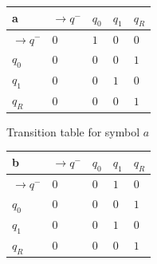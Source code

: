 \documentclass{mini}
\begin{document}
%
%
\begin{figure}[H]
    \begin{center}
        
        \setlength{\tabcolsep}{4pt}
        \renewcommand{\arraystretch}{1.4}
        
        \begin{subfigure}{.5\textwidth}
            
            \centering
            \begin{tabular}{|P{1.0cm} || P{0.8cm} | P{0.8cm} | P{0.8cm} | P{0.8cm}|}
                
                \hline
                a & $\rightarrow$$q^-$ & $q_0$ & $q_1$ & $q_R$ \\
                \hline
                \hline
                $\rightarrow$$q^-$ 		& $0$ & $1$ & $0$ & $0$ \\
                \hline
                $q_0$ 		& $0$ & $0$ & $0$ & $1$ \\
                \hline
                $q_1$ 		& $0$ & $0$ & $1$ & $0$ \\
                \hline
                $q_R$  					& $0$ & $0$ & $0$ & $1$ \\
                \hline
                
            \end{tabular}
            
            \caption{Transition table for symbol $a$}
            \label{fig:ttable_bin_a}	
            
        \end{subfigure}%
        \begin{subfigure}{.5\textwidth}
            
            \centering
            \begin{tabular}{|P{1.0cm} || P{0.8cm} | P{0.8cm} | P{0.8cm} | P{0.8cm}|}
                
                \hline
                b & $\rightarrow$$q^-$ & $q_0$ & $q_1$ & $q_R$ \\
                \hline
                \hline
                $\rightarrow$$q^-$ 		& $0$ & $0$ & $1$ & $0$ \\
                \hline
                $q_0$ 		& $0$ & $0$ & $0$ & $1$ \\
                \hline
                $q_1$ 		& $0$ & $0$ & $1$ & $0$ \\
                \hline
                $q_R$  					& $0$ & $0$ & $0$ & $1$ \\
                \hline
                

\end{tabular}
\end{subfigure}
\end{center}
\end{figure}
\end{document}
